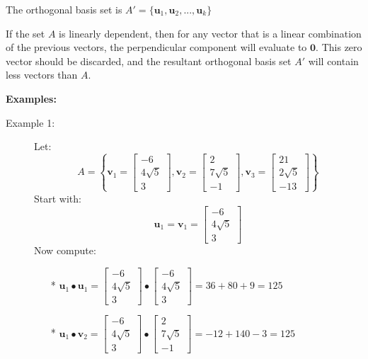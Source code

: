 \documentclass{article}
\begin{document}
The orthogonal basis set is \(A' = \{\mathbf{u}_1, \mathbf{u}_2, ..., \mathbf{u}_k\}\)

If the set \(A\) is linearly dependent, then for any vector that is a linear combination of the previous vectors, the perpendicular component will evaluate to \(\mathbf{0}\). This zero vector should be discarded, and the resultant orthogonal basis set \(A'\) will contain less vectors than \(A\).





\textbf{Examples:}
\begin{description}
\item[Example 1:] Let:
\[A = \left\{\mathbf{v}_1 = \begin{bmatrix} -6 \\ 4\sqrt{5} \\ 3 \end{bmatrix}, \mathbf{v}_2 = \begin{bmatrix} 2 \\ 7\sqrt{5} \\ -1 \end{bmatrix}, \mathbf{v}_3 = \begin{bmatrix} 21 \\ 2\sqrt{5} \\ -13 \end{bmatrix}\right\}\]
Start with: 
\[\mathbf{u}_1 = \mathbf{v}_1 = \begin{bmatrix} -6 \\ 4\sqrt{5} \\ 3 \end{bmatrix}\]
Now compute:
\begin{itemize}
\item[*] \(\mathbf{u}_1 \bullet \mathbf{u}_1 = \begin{bmatrix} -6 \\ 4\sqrt{5} \\ 3 \end{bmatrix} \bullet \begin{bmatrix} -6 \\ 4 \sqrt{5} \\ 3 \end{bmatrix} = 36 + 80 + 9 = 125\)
\item[*] \(\mathbf{u}_1 \bullet \mathbf{v}_2 = \begin{bmatrix} -6 \\ 4\sqrt{5} \\ 3 \end{bmatrix} \bullet \begin{bmatrix} 2 \\ 7\sqrt{5} \\ -1 \end{bmatrix} = -12 + 140 - 3 = 125\)

\end{itemize}
\end{description}
\end{document}
